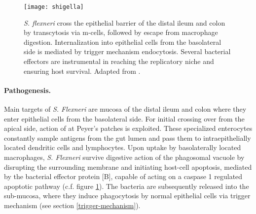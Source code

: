 \begin{figure}
  \centering
  \texttt{[image: shigella]}
  \caption[Route of infection and intracellular life-cycle of \textit{S. flexneri}.]{\textit{S. flexneri} cross the epithelial barrier of the distal ileum and colon by transcytosis via \acrshort{m-cells}, followed by escape from macrophage digestion. Internalization into epithelial cells from the basolateral side is mediated by trigger mechanism endocytosis. Several bacterial effectors are instrumental in reaching the replicatory niche and ensuring host survival. Adapted from \citet{Croxen2010}.}
  \label{fig:shigella}
\end{figure}

\paragraph{Pathogenesis.}
Main targets of \textit{S. Flexneri} are mucosa of the distal ileum and colon where they enter epithelial cells from the basolateral side. For initial crossing over from the apical side, action of  at Peyer's patches is exploited. These specialized enterocytes constantly sample antigens from the gut lumen and pass them to intraepithelially located dendritic cells and lymphocytes. Upon uptake by basolaterally located macrophages, \textit{S. Flexneri} survive digestive action of the phagosomal vacuole by disrupting the surrounding membrane and initiating host-cell apoptosis, mediated by the bacterial effector protein [B], capable of acting on a caspase 1 regulated apoptotic pathway (c.f. figure \ref{fig:shigella}). The bacteria are subsequently released into the sub-mucosa, where they induce phagocytosis by normal epithelial cells via trigger mechanism (see section \ref{trigger-mechanism}).

